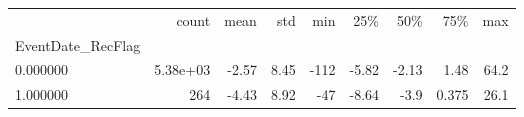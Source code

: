 \begin{tabular}{lrrrrrrrr}
\toprule
 & count & mean & std & min & 25\% & 50\% & 75\% & max \\
EventDate_RecFlag &  &  &  &  &  &  &  &  \\
\midrule
0.000000 & 5.38e+03 & -2.57 & 8.45 & -112 & -5.82 & -2.13 & 1.48 & 64.2 \\
1.000000 & 264 & -4.43 & 8.92 & -47 & -8.64 & -3.9 & 0.375 & 26.1 \\
\bottomrule
\end{tabular}
